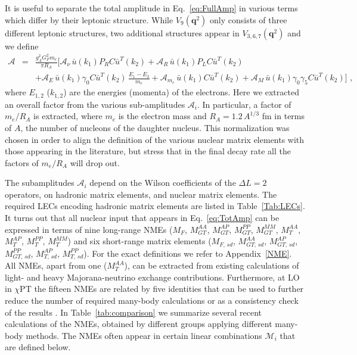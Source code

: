 \documentclass[letterpaper,11pt]{article}
\newcommand{\g}{\gamma}
\newcommand{\bea}{\begin{eqnarray}}
\newcommand{\eea}{\end{eqnarray}}
\renewcommand{\vec}[1]{{\mathbf #1}}
\newcommand{\sq}{^{2}}
\newcommand{\nn}{\nonumber}
\begin{document}
It is useful to separate the total amplitude in Eq.~\eqref{eq:FullAmp} in various terms which differ by their leptonic structure. While $V_{ 9}(\vec q\sq)$ only consists of three different leptonic structures, two additional structures appear in $V_{3,6,7}(\vec q\sq)$ and we define
\bea\label{eq:TotAmp}
\mathcal A&=& \frac{g_A\sq G_F\sq m_e}{\pi R_A}\bigg[\mathcal{ A}_{\nu}\, \bar u (k_1)P_R C\bar u^T(k_2)+ \mathcal{ A}_{R}\, \bar u (k_1)P_L C\bar u^T(k_2)\\
&&+ \mathcal{ A}_{ E}\, \bar u (k_1)\g_0 C\bar u^T(k_2)\,\frac{E_1-E_2}{m_e}
+ \mathcal{ A}_{ m_e}\, \bar u (k_1) C\bar u^T(k_2)+ \mathcal{ A}_{ M} \,\bar u (k_1)\g_0 \g_5 C\bar u^T(k_2)\bigg]\,\,,\nn
\eea
where  $E_{1,2}$ ($k_{1,2}$) are the energies (momenta) of the electrons. Here we extracted an overall factor from the various sub-amplitudes $\mathcal{ A}_{i}$. In particular, a factor of $m_e/R_A$ is extracted,  where $m_e$ is the electron mass and $R_A =1.2\,A^{1/3}$ fm in terms of $A$, the  number of nucleons of the daughter nucleus. This normalization was chosen in order to align the definition of the various nuclear matrix elements with those appearing in the literature, but stress that in the final decay rate all the factors of $m_e/R_A$ will drop out.

The subamplitudes $\mathcal A_{i}$ depend on the Wilson coefficients of the $\Delta L=2$ operators,  
on hadronic matrix elements,  and nuclear matrix elements. The required LECs encoding hadronic matrix elements are listed in Table~\ref{Tab:LECs}. It turns out that all nuclear input that appears in Eq.\ \eqref{eq:TotAmp} can be expressed in terms of nine long-range NMEs ($M_F$, $M^{AA}_{GT}$, $M^{AP}_{GT}$, $M^{PP}_{GT}$, $M^{MM}_{GT}$, $M^{AA}_{T}$, $M^{AP}_{T}$, $M^{PP}_{T}$, $M^{MM}_{T}$) and six short-range matrix elements  ($M_{F,\, sd}$, $M^{AA}_{GT,\, sd}$, $M^{AP}_{GT,\, sd}$, $M^{PP}_{GT,\, sd}$, $M^{AP}_{T,\, sd}$, $M^{PP}_{T,\, sd}$). For the exact definitions we refer to Appendix~\ref{NME}. All NMEs, apart from one ($M_T^{AA}$), can be extracted from existing calculations of light- and heavy Majorana-neutrino exchange contributions. Furthermore, at LO in $\chi$PT the fifteen NMEs are related by five identities that can be used to further reduce the number of required many-body calculations or as a consistency check of the results \cite{Cirigliano:2017djv}. In Table~\ref{tab:comparison} we summarize several recent calculations of the NMEs, obtained by different groups applying different many-body methods. The NMEs often appear in certain linear combinations $\mathcal M_i$ that are defined below.
\end{document}
